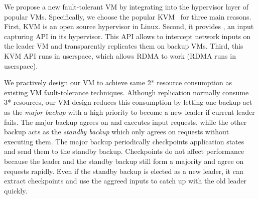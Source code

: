 We propose a new fault-tolerant VM by integrating \falcon into the hypervisor 
layer of popular VMs. Specifically, we choose the popular KVM~\cite{kvm} for 
three main reasons. First, KVM is an open source hypervisor in Linux. 
Second, it provides , an input capturing API in its hypervisor. 
This API allows \falcon to intercept network inputs on the leader VM and 
transparently replicates them on backup VMs. Third, this KVM API runs in 
userspace, which allows RDMA to work (RDMA runs in userspace).

We practively design our VM to achieve same 2* resource consumption as 
existing VM fault-tolerance techniques. Although \paxos replication 
normally consume 3* resources, our VM design reduces this consumption 
by letting one backup act as the \emph{major backup} with a high priority to 
become a new leader if current leader fails. The major backup agrees on and 
executes input requests, while the other backup acts as the \emph{standby 
backup} which only agrees on requests without executing them. The major backup 
periodically checkpoints application states and send them to the 
standby backup. Checkpoints do not affect performance because the leader and 
the standby backup still form a majority and agree on requests rapidly. Even if 
the standby backup is elected as a new leader, it can extract checkpoints and 
use the aggreed inputs to catch up with the old leader quickly.





